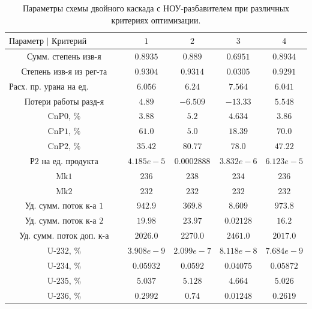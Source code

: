 \begin{table}
    \begin{tabular}{ccccc}
        $\text{Параметр | Критерий оптимизации}$ & $\text{1}$ & $\text{2}$ & $\text{3}$ & $\text{4}$\\ \hline
        $\text{Сумм. степень изв-я}$ & $0.8935$ & $0.889$ & $0.6951$ & $0.8934$\\ \hline
        $\text{Степень изв-я из рег-та}$ & $0.9304$ & $0.9314$ & $0.0305$ & $0.9291$\\ \hline
        $\text{Расх. пр. урана на ед. продукта}$ & $6.056$ & $6.24$ & $7.564$ & $6.041$\\ \hline
        $\text{Потери работы разд-я}$ & $4.89$ & $-6.509$ & $-13.33$ & $5.548$\\ \hline
        $\text{CnP0, \%}$ & $3.88$ & $5.2$ & $4.634$ & $3.86$\\ \hline
        $\text{CnP1, \%}$ & $61.0$ & $5.0$ & $18.39$ & $70.0$\\ \hline
        $\text{CnP2, \%}$ & $35.42$ & $80.77$ & $78.0$ & $47.22$\\ \hline
        $\text{Р2 на ед. продукта}$ & $4.185e-5$ & $0.0002888$ & $3.832e-6$ & $6.123e-5$\\ \hline
        $\text{Mk1}$ & $236$ & $238$ & $234$ & $236$\\ \hline
        $\text{Mk2}$ & $232$ & $232$ & $232$ & $232$\\ \hline
        $\text{Уд. сумм. поток к-а 1}$ & $942.9$ & $369.8$ & $8.609$ & $973.8$\\ \hline
        $\text{Уд. сумм. поток к-а 2}$ & $19.98$ & $23.97$ & $0.02128$ & $16.2$\\ \hline
        $\text{Уд. сумм. поток доп. к-а}$ & $2026.0$ & $2270.0$ & $2461.0$ & $2017.0$\\ \hline
        $\text{U-232, \%}$ & $3.908e-9$ & $2.099e-7$ & $8.118e-8$ & $7.684e-9$\\ \hline
        $\text{U-234, \%}$ & $0.05932$ & $0.0592$ & $0.04075$ & $0.05872$\\ \hline
        $\text{U-235, \%}$ & $5.037$ & $5.128$ & $4.664$ & $5.026$\\ \hline
        $\text{U-236, \%}$ & $0.2992$ & $0.74$ & $0.01248$ & $0.2619$
        \end{tabular}
\caption{Параметры схемы двойного каскада с НОУ-разбавителем при различных критериях оптимизации.{\label{2opt2}}}
\end{table}


